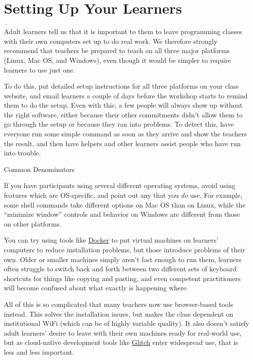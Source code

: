 \section{Setting Up Your Learners}\label{s:classroom-setup}

Adult learners tell us that it is important to them to leave programming
classes with their own computers set up to do real work. We therefore
strongly recommend that teachers be prepared to teach on all three major
platforms (Linux, Mac OS, and Windows), even though it would be simpler
to require learners to use just one.

To do this, put detailed setup instructions for all three platforms on
your class website, and email learners a couple of days before the
workshop starts to remind them to do the setup. Even with this, a few
people will always show up without the right software, either because
their other commitments didn't allow them to go through the setup or
because they ran into problems. To detect this, have everyone run some
simple command as soon as they arrive and show the teachers the result,
and then have helpers and other learners assist people who have run into
trouble.

\begin{aside}{Common Denominators}

If you have participants using several different operating systems,
avoid using features which are OS-specific, and point out any that you
\emph{do} use. For example, some shell commands take different options on
Mac OS than on Linux, while the ``minimize window'' controls and
behavior on Windows are different from those on other platforms.

\end{aside}

You can try using tools like \href{http://docker.com}{Docker} to put virtual machines
on learners' computers to reduce installation problems, but those
introduce problems of their own. Older or smaller machines simply
aren't fast enough to run them, learners often struggle to switch back
and forth between two different sets of keyboard shortcuts for things
like copying and pasting, and even competent practitioners will become
confused about what exactly is happening where.

All of this is so complicated that many teachers now use browser-based
tools instead. This solves the installation issues, but makes the
class dependent on institutional WiFi (which can be of highly variable
quality). It also doesn't satisfy adult learners' desire to leave with
their own machines ready for real-world use, but as cloud-native
development tools like \href{https://glitch.com/}{Glitch} enter widespread use, that is
less and less important.

